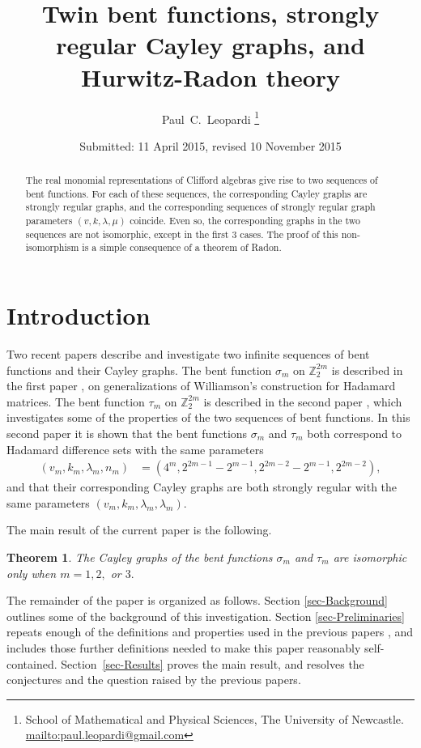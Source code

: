 \documentclass[12pt,a4paper]{article}
\title{Twin bent functions, strongly regular Cayley graphs, and Hurwitz-Radon theory}
\author{
Paul~C.~Leopardi
\thanks{School of Mathematical and Physical Sciences, The University of Newcastle.
\protect\url{mailto:paul.leopardi@gmail.com}}
}
\date{Submitted: 11 April 2015, revised 10 November 2015}
\newcommand{\mb}[1]{\mathbb{#1}}
\newcommand{\Z}{\mb{Z}}
\newtheorem{Theorem}{Theorem}
\begin{document}
\maketitle

\begin{abstract}
%
The real monomial representations of Clifford algebras
give rise to two sequences of bent functions.
For each of these sequences, the corresponding Cayley graphs are 
strongly regular graphs, and the corresponding sequences of strongly regular graph parameters
$(v,k,\lambda,\mu)$ coincide.
Even so, the corresponding graphs in the two sequences are not isomorphic, except in the first 3 cases.
The proof of this non-isomorphism is a simple consequence of a theorem of Radon.  
%
\end{abstract}

\section{Introduction}
\label{sec-Introduction}
Two recent papers \cite{Leo14Constructions,Leo15Bent} describe and investigate two infinite sequences of bent functions and their Cayley graphs.
The bent function $\sigma_m$ on $\Z_2^{2 m}$ is described in the first paper \cite{Leo14Constructions}, on 
generalizations of Williamson's construction for Hada\-mard matrices.
The bent function $\tau_m$ on $\Z_2^{2 m}$ is described in the second paper \cite{Leo15Bent},
which investigates some of the properties of the two sequences of bent functions.
In this second paper it is shown that the bent functions $\sigma_m$ and $\tau_m$ both correspond to Hadamard difference sets with the same parameters
\begin{align*}
(v_m,k_m,\lambda_m,n_m) &= (4^m, 2^{2 m - 1} - 2^{m-1}, 2^{2 m - 2} - 2^{m-1}, 2^{2 m - 2}),
\end{align*}
and that their corresponding Cayley graphs are both strongly regular with the same parameters $(v_m,k_m,\lambda_m,\lambda_m)$.

The main result of the current paper is the following.
\begin{Theorem}\label{HR-non-imomorphic-theorem}
The Cayley graphs of the bent functions $\sigma_m$ and $\tau_m$ are isomorphic only when $m=1, 2,$ or $3.$ 
\end{Theorem}

The remainder of the paper is organized as follows.
Section \ref{sec-Background} outlines some of the background of this investigation.
Section \ref{sec-Preliminaries} repeats enough of the definitions and properties used in the previous papers \cite{Leo14Constructions, Leo15Bent},
and includes those further definitions needed to make this paper reasonably self-contained.
Section~\ref{sec-Results} proves the main result, and resolves the conjectures and the question raised by the previous papers.
\end{document}

